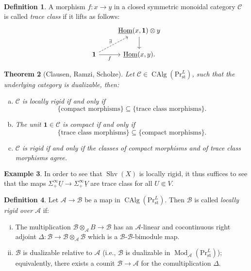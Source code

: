 \documentclass[draft]{amsart}
\newcommand{\ul}[1]{\underline{#1}}
\newcommand{\cat}[1]{\mathcal{#1}}
\newcommand{\ssubset}{\Subset}
\renewcommand{\Pr}{\mathrm{Pr}}
\newcommand{\one}{\mathbf{1}}
\DeclareMathOperator{\CAlg}{CAlg}
\DeclareMathOperator{\Shv}{Shv}
\DeclareMathOperator{\Mod}{Mod}
\DeclareMathOperator{\iHom}{\ul{Hom}}
\newtheorem{thm}{Theorem}[section]
\theoremstyle{definition}
\newtheorem{defn}[thm]{Definition}
\newtheorem{ex}[thm]{Example}
\begin{document}
\begin{defn}
A morphism $f\colon x\to y$ in a closed symmetric monoidal category $\cat C$ is called \emph{trace class} if it lifts as follows:
\[
\begin{tikzcd}
& \iHom(x,\one) \otimes y \ar[d] \\
\one \ar[ur,dashed,"\exists"] \ar[r,"f"'] & \iHom(x,y).
\end{tikzcd}
\]
\end{defn}

\begin{thm}[Clausen, Ramzi, Scholze]
Let $\cat C \in \CAlg(\Pr^L_{\mathrm{st}})$, such that the underlying category is dualizable, then:
\begin{enumerate}[(a)]
\item $\cat C$ is locally rigid if and only if 
\[
\{\text{compact morphisms}\} \subseteq \{\text{trace class morphisms}\}.
\]
\item The unit $\one\in \cat C$ is compact if and only if 
\[
\{\text{trace class morphisms}\} \subseteq \{\text{compact morphisms}\}.
\]
\item $\cat C$ is rigid if and only if the classes of compact morphisms and of trace class morphisms agree.
\end{enumerate}
\end{thm}

\begin{ex}
In order to see that $\Shv(X)$ is locally rigid, it thus suffices to see that the maps $\Sigma^\infty_+\ul U \to \Sigma^\infty_+\ul V$ are trace class for all $U \ssubset V$.
\end{ex}

\begin{defn}
Let $\cat A \to \cat B$ be a map in $\CAlg(\Pr^L_{\mathrm{st}})$. Then $\cat B$ is called \emph{locally rigid over $\cat A$} if:
\begin{enumerate}[(i)]
\item The multiplication $\cat B\otimes_{\cat A}B \to \cat B$ has an $\cat A$-linear and cocontinuous right adjoint $\Delta \colon \cat B\to \cat B\otimes_{\cat A} \cat B$ which is a $\cat B$-$\cat B$-bimodule map.

\item $\cat B$ is dualizable relative to $\cat A$ (i.e., $\cat B$ is dualizable in $\Mod_{\cat A}(\Pr^L_{\mathrm{st}})$); equivalently, there exists a counit $\cat B\to \cat A$ for the comultiplication $\Delta$.
\end{enumerate}
\end{defn}
\end{document}

